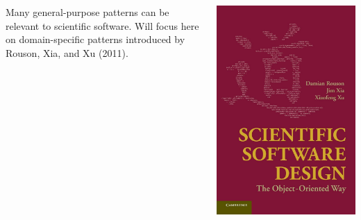 \documentclass[12pt]{beamer}
\begin{document}
\begin{frame}
\begin{columns}
\begin{column}{0.5\textwidth}
      \vspace{3mm} Many general-purpose patterns can be relevant
      to scientific software. Will focus here on domain-specific
      patterns introduced by Rouson, Xia, and Xu (2011).
    \end{column}
    \begin{column}{0.5\textwidth}
      \begin{center}
        \includegraphics[height=0.9\textheight]{Rouson.jpg}
      \end{center}

    \end{column}
  \end{columns}
\end{frame}

\end{document}
